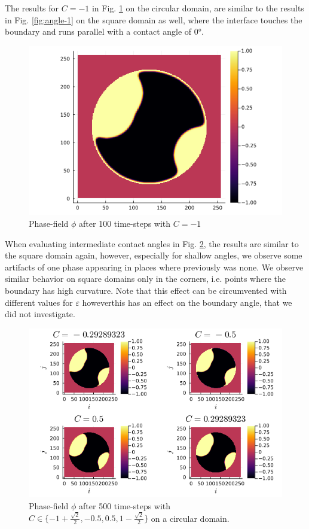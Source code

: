 \documentclass{mimosis}
\begin{document}
The results for \(C=-1\) in Fig. \ref{fig:angle-1c} on the circular domain, are similar to the results in Fig. \ref{fig:angle-1} on the square domain as well, where the interface touches the boundary and runs parallel with a contact angle of 0°.
\begin{figure}[htbp]
\centering
\includegraphics[width=.9\linewidth]{images/angle-1c.png}
\caption{\label{fig:angle-1c}Phase-field \(\phi\) after 100 time-steps with \(C=-1\)}
\end{figure}

When evaluating intermediate contact angles in Fig. \ref{fig:angle-multiplec}, the results are similar to the square domain again, however, especially for shallow angles, we observe some artifacts of one phase appearing in places where previously was none. We observe similar behavior on square domains only in the corners, i.e. points where the boundary has high curvature. Note that this effect can be circumvented with different values for \(\varepsilon\) howeverthis has an effect on the boundary angle, that we did not investigate.
\begin{figure}[htbp]
\centering
\includegraphics[width=.9\linewidth]{images/angle-multiplec.png}
\caption{\label{fig:angle-multiplec}Phase-field \(\phi\) after 500 time-steps with \(C \in \{-1 + \frac{\sqrt{2}}{2} , -0.5 , 0.5 , 1 - \frac{\sqrt{2}}{2} \}\) on a circular domain.}
\end{figure}
\end{document}
